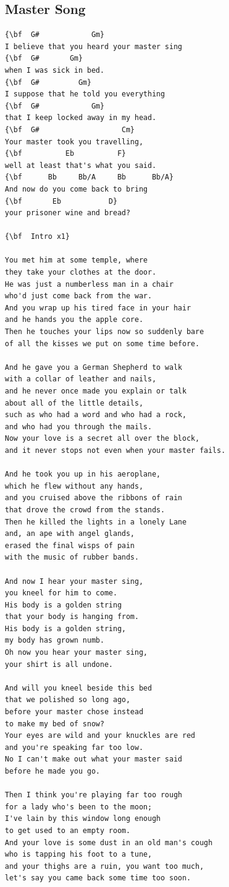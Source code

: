 \documentclass[a4paper]{article}
\begin{document}
\subsection{Master Song}
\begin{Verbatim}[commandchars=\\\{\}]
{\bf  G#            Gm}
I believe that you heard your master sing 
{\bf  G#       Gm}
when I was sick in bed. 
{\bf  G#         Gm}
I suppose that he told you everything 
{\bf  G#            Gm}
that I keep locked away in my head. 
{\bf  G#                   Cm}
Your master took you travelling, 
{\bf          Eb          F}
well at least that's what you said. 
{\bf      Bb     Bb/A     Bb      Bb/A}
And now do you come back to bring 
{\bf       Eb           D}
your prisoner wine and bread? 

{\bf  Intro x1}

You met him at some temple, where 
they take your clothes at the door. 
He was just a numberless man in a chair 
who'd just come back from the war. 
And you wrap up his tired face in your hair 
and he hands you the apple core. 
Then he touches your lips now so suddenly bare 
of all the kisses we put on some time before. 

And he gave you a German Shepherd to walk 
with a collar of leather and nails, 
and he never once made you explain or talk 
about all of the little details, 
such as who had a word and who had a rock, 
and who had you through the mails. 
Now your love is a secret all over the block, 
and it never stops not even when your master fails. 

And he took you up in his aeroplane, 
which he flew without any hands, 
and you cruised above the ribbons of rain 
that drove the crowd from the stands. 
Then he killed the lights in a lonely Lane 
and, an ape with angel glands, 
erased the final wisps of pain 
with the music of rubber bands. 

And now I hear your master sing, 
you kneel for him to come. 
His body is a golden string 
that your body is hanging from. 
His body is a golden string, 
my body has grown numb. 
Oh now you hear your master sing, 
your shirt is all undone. 

And will you kneel beside this bed 
that we polished so long ago, 
before your master chose instead 
to make my bed of snow? 
Your eyes are wild and your knuckles are red 
and you're speaking far too low. 
No I can't make out what your master said 
before he made you go. 

Then I think you're playing far too rough 
for a lady who's been to the moon; 
I've lain by this window long enough 
to get used to an empty room. 
And your love is some dust in an old man's cough 
who is tapping his foot to a tune, 
and your thighs are a ruin, you want too much, 
let's say you came back some time too soon. 


\end{Verbatim}
\end{document}
